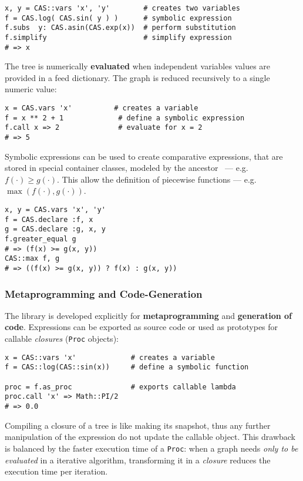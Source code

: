 \noindent%
\begin{lstlisting}[caption={Simplification example},label={code:example-simp}]
x, y = CAS::vars 'x', 'y'        # creates two variables
f = CAS.log( CAS.sin( y ) )      # symbolic expression
f.subs  y: CAS.asin(CAS.exp(x))  # perform substitution
f.simplify                       # simplify expression
# => x
\end{lstlisting}

The tree is numerically \textbf{evaluated} when independent variables values are provided in a feed dictionary. The graph is reduced recursively to a single numeric value:

\noindent%
\begin{lstlisting}[caption={Tree evaluation example},label={code:example-call}]
x = CAS.vars 'x'          # creates a variable
f = x ** 2 + 1             # define a symbolic expression
f.call x => 2              # evaluate for x = 2
# => 5
\end{lstlisting}

Symbolic expressions can be used to create comparative expressions, that are stored in special container classes, modeled by the ancestor \CASExpression~--- e.g. $f(\cdot) \geq g(\cdot)$. This allow the definition of piecewise functions --- e.g. $\max(f(\cdot), g(\cdot))$.

\noindent%
\begin{lstlisting}[caption={Expressions and Piecewise functions},label={code:example-expr}]
x, y = CAS.vars 'x', 'y'
f = CAS.declare :f, x
g = CAS.declare :g, x, y
f.greater_equal g
# => (f(x) >= g(x, y))
CAS::max f, g
# => ((f(x) >= g(x, y)) ? f(x) : g(x, y))
\end{lstlisting}

\subsubsection{Metaprogramming and Code-Generation}

The library is developed explicitly for \textbf{meta\-programming} and \textbf{generation of code}. Expressions can be exported as source code or used as prototypes for callable \emph{closures} (\texttt{Proc} objects):

\noindent%
\begin{lstlisting}[caption={Graph evaluation example},label={code:example-proc}]
x = CAS::vars 'x'             # creates a variable
f = CAS::log(CAS::sin(x))     # define a symbolic function

proc = f.as_proc              # exports callable lambda
proc.call 'x' => Math::PI/2
# => 0.0
\end{lstlisting}
Compiling a closure of a tree is like making its snapshot, thus any further manipulation of the expression do not update the callable object. This drawback is balanced by the faster execution time of a \texttt{Proc}: when a graph needs \emph{only to be evaluated} in a iterative algorithm, transforming it in a \emph{closure} reduces the execution time per iteration.

